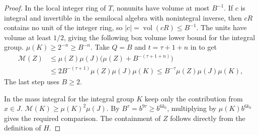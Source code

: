 \begin{proof}
In the local integer ring of $T$, nonunits have volume at most $B^{-1}$.
If $c$ is integral and invertible in the semilocal algebra with nonintegral inverse,
then $cR$ contains no unit of the integer ring, so $|c|=\operatorname{vol}(cR)\le B^{-1}$.
The units have volume at least $1/2$, giving the following box volume lower bound for the integral group.
$\mu(K)\ge2^{-n}\ge B^{-n}$.
Take $Q=B$ and $t=\tau+1+n$ in  to get
\[
 \begin{aligned}
 \mathcal M(Z)
 &\le \mu(Z)\mu(J)
       \bigl(\mu(Z)+B^{-(\tau+1+n)}\bigr)\\
 &\le 2B^{-(\tau+1)}\mu(Z)\mu(J)\mu(K)
 \le B^{-\tau}\mu(Z)\mu(J)\mu(K),
 \end{aligned}
\]
The last step uses $B\ge2$.

In the mass integral for the integral group $K$ keep only the contribution from $x\in J$.
$\mathcal M(K)\ge\mu(K)^2\mu(J)$.
By $B^\tau=b^{9\tau}\ge b^{6k_0}$, multiplying by $\mu(K)b^{6k_0}$
gives the required comparison. The containment of $Z$ follows directly from the definition of $H$.
\end{proof}

